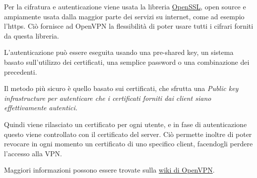 

Per la cifratura e autenticazione viene usata la libreria \href{https://en.wikipedia.org/wiki/OpenSSL}{OpenSSL}, open source e ampiamente usata dalla maggior parte dei servizi su internet, come ad esempio l'https. Ciò fornisce ad OpenVPN la flessibilità di poter usare tutti i cifrari forniti da questa libreria.


L'autenticazione può essere eseguita usando una pre-shared key, un sistema basato sull'utilizzo dei certificati, una semplice password o una combinazione dei precedenti.

Il metodo più sicuro è quello basato sui certificati, che sfrutta una \it{Public key infrastructure} per autenticare che i certificati forniti dai client siano effettivamente autentici. 

Quindi viene rilasciato un certificato per ogni utente, e in fase di autenticazione questo viene controllato con il certificato del server. Ciò permette inoltre di poter revocare in ogni momento un certificato di uno specifico client, facendogli perdere l'accesso alla VPN.


Maggiori informazioni possono essere trovate sulla \href{https://community.openvpn.net/openvpn/wiki/How_does_PKI_work}{wiki di OpenVPN}.



